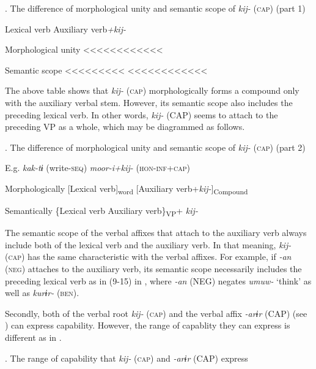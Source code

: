 \begin{styleBeschriftung}
\textmd{. The difference of morphological unity and semantic scope of} \textmd{\textit{kij-}}\textmd{ (\textsc{cap}) (part 1)}
\end{styleBeschriftung}

  Lexical verb  Auxiliary verb\textit{+kij-}

Morphological unity    <<<<<<<<<<<<

Semantic scope  <<<<<<<<<  <<<<<<<<<<<<

The above table shows that \textit{kij-} (\textsc{cap}) morphologically forms a compound only with the auxiliary verbal stem. However, its semantic scope also includes the preceding lexical verb. In other words, \textit{kij-} (CAP) seems to attach to the preceding VP as a whole, which may be diagrammed as follows.

\begin{styleBeschriftung}
\textmd{. The difference of morphological unity and semantic scope of} \textmd{\textit{kij-}}\textmd{ (\textsc{cap}) (part 2)}
\end{styleBeschriftung}

E.g.  \textit{kak-tɨ} (write-\textsc{seq})  \textit{moor-i+kij-} (\textsc{hon}-\textsc{inf}+\textsc{cap})

Morphologically  [Lexical verb]\textsubscript{word}  [Auxiliary verb+\textit{kij-}]\textsubscript{Compound}

Semantically  \{Lexical verb  Auxiliary verb\}\textsubscript{VP}+ \textit{kij-}

The semantic scope of the verbal affixes that attach to the auxiliary verb always include both of the lexical verb and the auxiliary verb. In that meaning, \textit{kij-} (\textsc{cap}) has the same characteristic with the verbal affixes. For example, if \textit{{}-an} (\textsc{neg}) attaches to the auxiliary verb, its semantic scope necessarily includes the preceding lexical verb as in (9-15) in , where \textit{-an} (NEG) negates \textit{umuw-} ‘think’ as well as \textit{kurɨr-} (\textsc{ben}).

  Secondly, both of the verbal root \textit{kij-} (\textsc{cap}) and the verbal affix \textit{{}-arɨr} (CAP) (see ) can express capability. However, the range of capablity they can express is different as in .

\begin{styleBeschriftung}
\textmd{}\textmd{. The range of capability that} \textmd{\textit{kij-}}\textmd{ (\textsc{cap}) and} \textmd{\textit{{}-arɨr}}\textmd{ (CAP) express}
\end{styleBeschriftung}

